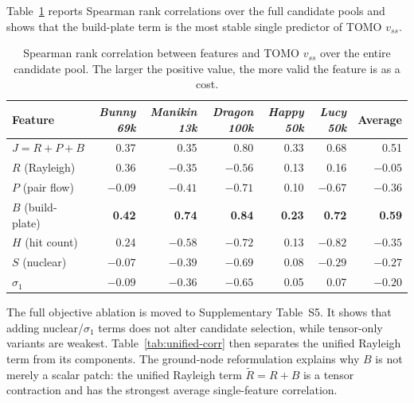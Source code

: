 \documentclass[11pt,a4paper]{article}
\begin{document}
Table~\ref{tab:feature-corr} reports Spearman rank correlations over the full candidate pools and shows that the build-plate term is the most stable single predictor of TOMO $v_{ss}$.

\begin{table}[H]
\centering
\small
\caption{Spearman rank correlation between features and TOMO $v_{ss}$ over the entire candidate pool.
The larger the positive value, the more valid the feature is as a cost.}
\label{tab:feature-corr}
\begin{tabular}{lrrrrrr}
\toprule
Feature & \emph{Bunny 69k} & \emph{Manikin 13k} & \emph{Dragon 100k} & \emph{Happy 50k} & \emph{Lucy 50k} & Average\\
\midrule
$J=R{+}P{+}B$         & 0.37 & 0.35 & 0.80 & 0.33 & 0.68 & 0.51\\
$R$ (Rayleigh)        & 0.36 & $-0.35$ & $-0.56$ & 0.13 & 0.16 & $-0.05$\\
$P$ (pair flow)       & $-0.09$ & $-0.41$ & $-0.71$ & 0.10 & $-0.67$ & $-0.36$\\
$B$ (build-plate)     & \textbf{0.42} & \textbf{0.74} & \textbf{0.84} & \textbf{0.23} & \textbf{0.72} & \textbf{0.59}\\
$H$ (hit count)       & 0.24 & $-0.58$ & $-0.72$ & 0.13 & $-0.82$ & $-0.35$\\
$S$ (nuclear)         & $-0.07$ & $-0.39$ & $-0.69$ & 0.08 & $-0.29$ & $-0.27$\\
$\sigma_1$            & $-0.09$ & $-0.36$ & $-0.65$ & 0.05 & 0.07 & $-0.20$\\
\bottomrule
\end{tabular}
\end{table}

The full objective ablation is moved to Supplementary Table~S5. It shows that adding nuclear/$\sigma_1$ terms does not alter candidate selection, while tensor-only variants are weakest. Table~\ref{tab:unified-corr} then separates the unified Rayleigh term from its components. The ground-node reformulation explains why $B$ is not merely a scalar patch: the unified Rayleigh term $\tilde R=R+B$ is a tensor contraction and has the strongest average single-feature correlation.
\end{document}
